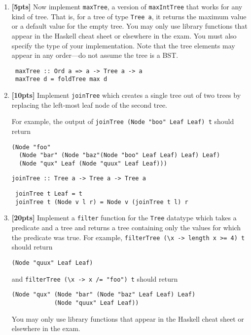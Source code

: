 \documentclass[paper=letter, fontsize=13pt]{article} %
\numberwithin{equation}{section} %
\newif\ifshowanswers\showanswerstrue
\begin{document}
\begin{enumerate}
\item \textbf{[5pts]} 
  Now implement \texttt{maxTree}, a version of \texttt{maxIntTree} that works for any kind of tree. That is, for a tree of type \texttt{Tree a}, it returns 
   the maximum value or a default value for the empty tree.
  You may only use library functions that appear in the Haskell cheat sheet or elsewhere in the exam. You must also specify the type of your implementation.  
  Note that the tree elements may appear in any order—do not assume the tree is a BST.

\ifshowanswers 
\begin{lstlisting}
 maxTree :: Ord a => a -> Tree a -> a
 maxTree d = foldTree max d
\end{lstlisting}
\else
\begin{verbatim}

 maxTree :: ___________________________________________
\end{verbatim}
\bigskip 
\bigskip 
\bigskip 
\bigskip 
\bigskip 
\bigskip 
\bigskip 
\bigskip 
\bigskip 
\bigskip 
\bigskip 
\bigskip 
\fi

\item \textbf{[10pts]} Implement \texttt{joinTree} which creates a single tree out of two trees
by replacing the left-most leaf node of the second tree.  

For example, the output of \texttt{joinTree (Node "boo" Leaf Leaf) t} should return
\begin{verbatim}
(Node "foo"  
  (Node "bar" (Node "baz"(Node "boo" Leaf Leaf) Leaf) Leaf) 
  (Node "qux" Leaf (Node "quux" Leaf Leaf)))
\end{verbatim}

\begin{verbatim}
joinTree :: Tree a -> Tree a -> Tree a
\end{verbatim}
      
\ifshowanswers 
\begin{lstlisting}
 joinTree t Leaf = t 
 joinTree t (Node v l r) = Node v (joinTree t l) r 
\end{lstlisting}
\else
     \bigskip
     \bigskip
     \bigskip
     \bigskip
     \bigskip
     \bigskip
     \bigskip
     \bigskip
     \bigskip
     \bigskip
\fi

\newpage
\item \textbf{[20pts]} Implement a \texttt{filter} function for the \texttt{Tree} datatype
which takes a predicate and a tree and returns a tree containing only the values for which 
the predicate was true. For example, \verb|filterTree (\x -> length x >= 4) t| should return
\begin{verbatim}
(Node "quux" Leaf Leaf)
\end{verbatim}
and \verb|filterTree (\x -> x /= "foo") t| should return
\begin{verbatim}
(Node "qux" (Node "bar" (Node "baz" Leaf Leaf) Leaf) 
            (Node "quux" Leaf Leaf))
\end{verbatim}
You may only use library functions that appear in the Haskell cheat sheet or elsewhere in the exam.


\end{enumerate}
\end{document}
